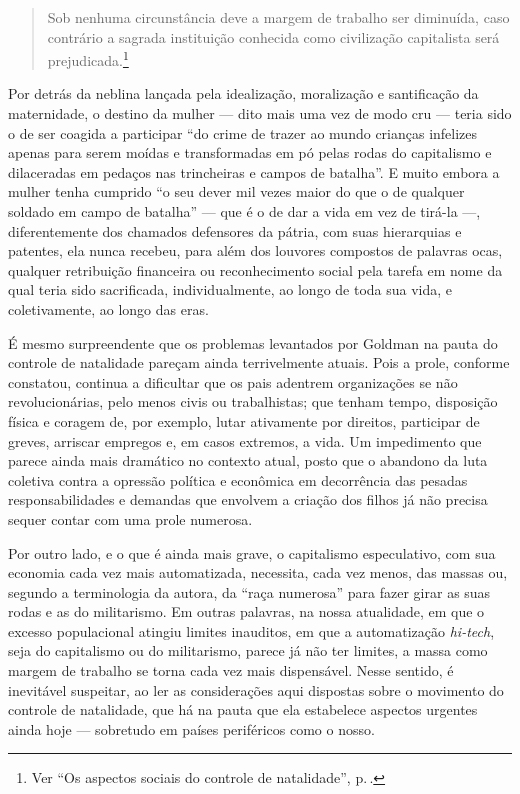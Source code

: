 \begin{quote}
Sob nenhuma circunstância deve a margem de trabalho
ser diminuída, caso contrário a sagrada instituição conhecida como
civilização capitalista será prejudicada.\footnote{Ver ``Os aspectos sociais do controle de natalidade'', p.\,\pageref{margem}.}
\end{quote}

Por detrás da neblina
lançada pela idealização, moralização e santificação da maternidade, o
destino da mulher --- dito mais uma vez de modo cru --- teria sido o de
ser coagida a participar ``do crime de trazer ao mundo crianças
infelizes apenas para serem moídas e transformadas em pó pelas rodas do
capitalismo e dilaceradas em pedaços nas trincheiras e campos de
batalha''. E muito embora a mulher tenha cumprido ``o seu dever mil vezes maior do
que o de qualquer soldado em campo de batalha'' --- que é o de dar
a vida em vez de tirá-la ---, diferentemente dos chamados defensores da
pátria, com suas hierarquias e patentes, ela nunca recebeu, para além
dos louvores compostos de palavras ocas, qualquer retribuição financeira
ou reconhecimento social pela tarefa em nome da qual teria sido
sacrificada, individualmente, ao longo de toda sua vida, e
coletivamente, ao longo das eras.

É mesmo surpreendente que os problemas levantados por Goldman na pauta
do controle de natalidade pareçam ainda terrivelmente atuais. Pois a
prole, conforme constatou, continua a dificultar que os pais
adentrem organizações se não revolucionárias, pelo menos civis ou
trabalhistas; que tenham tempo, disposição física e coragem de, por
exemplo, lutar ativamente por direitos, participar de greves, arriscar
empregos e, em casos extremos, a vida. Um impedimento que parece ainda
mais dramático no contexto atual, posto que o abandono da luta coletiva
contra a opressão política e econômica em decorrência das pesadas
responsabilidades e demandas que envolvem a criação dos filhos já não
precisa sequer contar com uma prole numerosa.

Por outro lado, e o que é
ainda mais grave, o capitalismo especulativo, com sua economia cada vez
mais automatizada, necessita, cada vez menos, das massas ou, segundo a
terminologia da autora, da ``raça numerosa'' para fazer girar as suas
rodas e as do militarismo. Em outras palavras, na nossa atualidade, em
que o excesso populacional atingiu limites inauditos, em que a
automatização \textit{hi-tech}, seja do capitalismo ou do militarismo, parece
já não ter limites, a massa como margem de trabalho se torna cada vez
mais dispensável. Nesse sentido, é inevitável suspeitar, ao ler as
considerações aqui dispostas sobre o movimento do controle de
natalidade, que há na pauta que ela estabelece aspectos urgentes ainda
hoje --- sobretudo em países periféricos como o nosso. 

